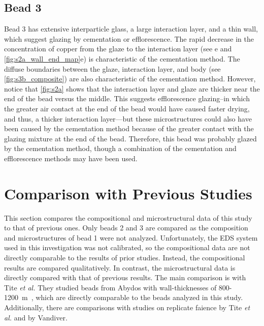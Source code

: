 \subsection{Bead 3}

Bead 3 has extensive interparticle glass, a large interaction layer, and a thin wall, which suggest glazing by cementation or efflorescence. The rapid decrease in the concentration of copper from the glaze to the interaction layer (see e and \ref{fig:s2a_wall_end_map}e) is characteristic of the cementation method. The diffuse boundaries between the glaze, interaction layer, and body (see \autoref{fig:s3b_composite}) are also characteristic of the cementation method. However, notice that \autoref{fig:s2a} shows that the interaction layer and glaze are thicker near the end of the bead versus the middle. This suggests efflorescence glazing--in which the greater air contact at the end of the bead would have caused faster drying, and thus, a thicker interaction layer---but these microstructures could also have been caused by the cementation method because of the greater contact with the glazing mixture at the end of the bead. Therefore, this bead was probably glazed by the cementation method, though a combination of the cementation and efflorescence methods may have been used.




\section{Comparison with Previous Studies}

This section compares the compositional and microstructural data of this study to that of previous ones. Only beads 2 and 3 are compared as the composition and microstructures of bead 1 were not analyzed. Unfortunately, the EDS system used in this investigation was not calibrated, so the compositional data are not directly comparable to the results of prior studies. Instead, the compositional results are compared qualitatively. In contrast, the microstructural data is directly compared with that of previous results. The main comparison is with Tite \emph{et al.} They studied beads from Abydos with wall-thicknesses of 800-1200~\textmu m~\cite{tite07}, which are directly comparable to the beads analyzed in this study. Additionally, there are comparisons with studies on replicate faience by Tite \emph{et al.} and by Vandiver.

